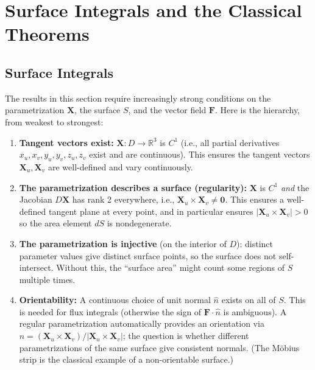 \documentclass[11pt]{report}
\newcommand{\R}{\mathbb{R}}
\begin{document}
\chapter{Surface Integrals and the Classical Theorems}

\section{Surface Integrals}

\begin{note}
The results in this section require increasingly strong conditions on the parametrization $\mathbf{X}$, the surface $S$, and the vector field $\mathbf{F}$. Here is the hierarchy, from weakest to strongest:

\begin{enumerate}[itemsep=4pt]
    \item \textbf{Tangent vectors exist:} $\mathbf{X}: D \to \R^3$ is $C^1$ (i.e., all partial derivatives $x_u, x_v, y_u, y_v, z_u, z_v$ exist and are continuous). This ensures the tangent vectors $\mathbf{X}_u, \mathbf{X}_v$ are well-defined and vary continuously.

    \item \textbf{The parametrization describes a surface (regularity):} $\mathbf{X}$ is $C^1$ \textit{and} the Jacobian $D\mathbf{X}$ has rank 2 everywhere, i.e., $\mathbf{X}_u \times \mathbf{X}_v \neq \mathbf{0}$. This ensures a well-defined tangent plane at every point, and in particular ensures $|\mathbf{X}_u \times \mathbf{X}_v| > 0$ so the area element $dS$ is nondegenerate.

    \item \textbf{The parametrization is injective} (on the interior of $D$): distinct parameter values give distinct surface points, so the surface does not self-intersect. Without this, the ``surface area'' might count some regions of $S$ multiple times.

    \item \textbf{Orientability:} A continuous choice of unit normal $\hat{n}$ exists on all of $S$. This is needed for flux integrals (otherwise the sign of $\mathbf{F} \cdot \hat{n}$ is ambiguous). A regular parametrization automatically provides an orientation via $\hat{n} = (\mathbf{X}_u \times \mathbf{X}_v) / |\mathbf{X}_u \times \mathbf{X}_v|$; the question is whether different parametrizations of the same surface give consistent normals. (The M\"obius strip is the classical example of a non-orientable surface.)


\end{enumerate}
\end{note}
\end{document}
